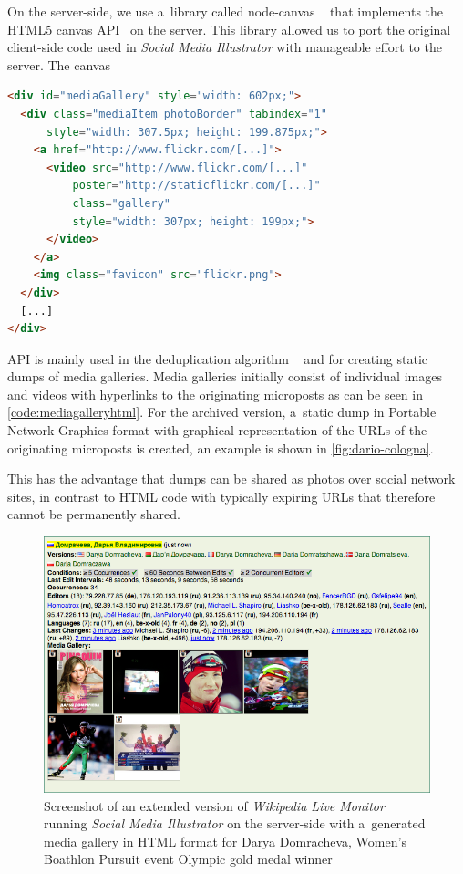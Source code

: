 \documentclass{sig-alternate}
\begin{document}
On the server-side, we use a~library called node-canvas%
~\cite{holowaychuk2013nodecanvas} that implements the
HTML5 canvas API~\cite{cabanier2013canvas} on the server.
This library allowed us to port the original client-side code 
used in \emph{Social Media Illustrator}
with manageable effort to the server. The canvas\linebreak

\vspace{-2em}
\begin{lstlisting}[caption={Simplified \emph{Strict Order, Equal Size}
  HTML code}, label=code:mediagalleryhtml, language=HTML]
<div id="mediaGallery" style="width: 602px;">
  <div class="mediaItem photoBorder" tabindex="1"
      style="width: 307.5px; height: 199.875px;">
    <a href="http://www.flickr.com/[...]">
      <video src="http://www.flickr.com/[...]"
          poster="http://staticflickr.com/[...]"
          class="gallery"
          style="width: 307px; height: 199px;">
      </video>
    </a>
    <img class="favicon" src="flickr.png">
  </div>
  [...]
</div>
\end{lstlisting}

\noindent API is mainly used in the deduplication algorithm%
~\cite{steiner2013clustering}
and for creating static dumps of media galleries.
Media galleries initially consist of individual images and videos
with hyperlinks to the originating microposts
as can be seen in \autoref{code:mediagalleryhtml}.
For the archived version, a~static dump
in Portable Network Graphics format
with graphical representation of the URLs
of the originating microposts is created,
an example is shown in \autoref{fig:dario-cologna}.

This has the advantage that dumps
can be shared as photos over social network sites,
in contrast to  HTML code with typically expiring URLs
that therefore cannot be permanently shared.

\begin{figure}[t!]
  \centering
  \includegraphics[width=0.75\columnwidth]{figures/wikipedia-live-monitor.png}
  \caption{Screenshot of an extended version of \emph{Wikipedia Live Monitor
  }
  running \emph{Social Media Illustrator} on the server-side
  with a~generated media gallery in HTML format
  for Darya Domracheva, Women's Boathlon Pursuit event Olympic gold medal winner}
  \label{fig:wikipedia-live-monitor}    
\end{figure}
\end{document}
